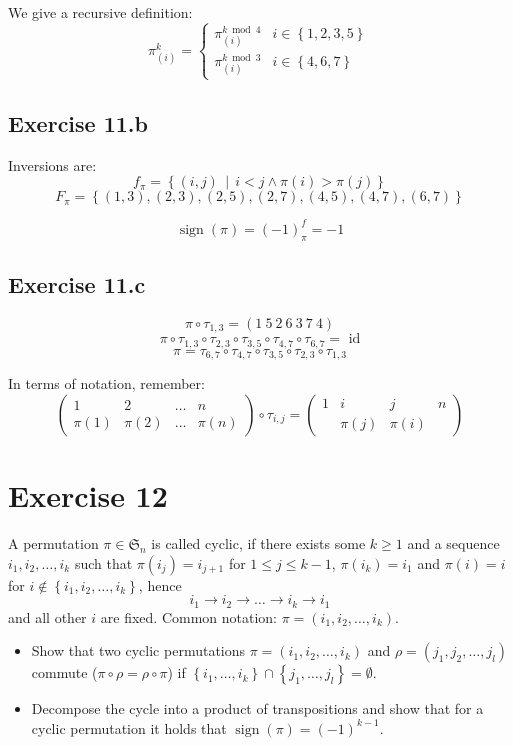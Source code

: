 \documentclass[a4paper]{article}
\theoremstyle{definition}
\DeclareMathOperator\sign{sign}
\newcommand\set[1]{\left\{#1\right\}}
\newcommand\setdef[2]{\left\{#1\,\middle|\,#2\right\}}
\begin{document}
We give a recursive definition:
\[
  \pi_{(i)}^k = \begin{cases}
    \pi_{(i)}^{k \bmod{4}} & i \in \set{1,2,3,5} \\
    \pi_{(i)}^{k \bmod{3}} & i \in \set{4, 6, 7}
  \end{cases}
\]

\subsection{Exercise 11.b}
%
Inversions are:
\[ f_\pi = \setdef{(i,j)}{i < j \land \pi(i) > \pi(j)} \]
\[ F_\pi = \set{(1,3), (2,3), (2,5), (2,7), (4,5), (4,7), (6,7)} \]

\[ \sign(\pi) = (-1)^f_\pi = -1 \]

\subsection{Exercise 11.c}
%
\[ \pi \circ \tau_{1,3} = (1\ 5\ 2\ 6\ 3\ 7\ 4) \]
\[ \pi \circ \tau_{1,3} \circ \tau_{2,3} \circ \tau_{3,5} \circ \tau_{4,7} \circ \tau_{6,7} = \text{ id} \]
\[ \pi = \tau_{6,7} \circ \tau_{4,7} \circ \tau_{3,5} \circ \tau_{2,3} \circ \tau_{1,3} \]

In terms of notation, remember:
\[
  \begin{pmatrix}
    1 & 2 & \ldots & n \\
    \pi(1) & \pi(2) & \ldots & \pi(n)
  \end{pmatrix}
  \circ
  \tau_{i,j}
  = \begin{pmatrix}
    1 & i & j & n \\
      & \pi(j) & \pi(i) &
  \end{pmatrix}
\]

\section{Exercise 12}
\begin{ex}
  A permutation $\pi \in \mathfrak S_n$ is called cyclic, if there exists
  some $k \geq 1$ and a sequence $i_1, i_2, \ldots, i_k$ such that
  $\pi(i_j) = i_{j+1}$ for $1 \leq j \leq k-1$, $\pi(i_k) = i_1$
  and $\pi(i) = i$ for $i \not\in \set{i_1, i_2, \ldots, i_k}$, hence
  \[ i_1 \to i_2 \to \ldots \to i_k \to i_1 \]
  and all other $i$ are fixed. Common notation: $\pi = (i_1, i_2, \ldots, i_k)$.
  \begin{itemize}
    \item Show that two cyclic permutations $\pi = (i_1, i_2, \ldots, i_k)$
      and $\rho = (j_1, j_2, \ldots, j_l)$ commute ($\pi \circ \rho = \rho \circ \pi$)
      if $\set{i_1, \ldots, i_k} \cap \set{j_1, \ldots, j_l} = \emptyset$.
    \item
      Decompose the cycle into a product of transpositions and show that
      for a cyclic permutation it holds that $\sign(\pi) = (-1)^{k-1}$.
  \end{itemize}
\end{ex}
\end{document}
